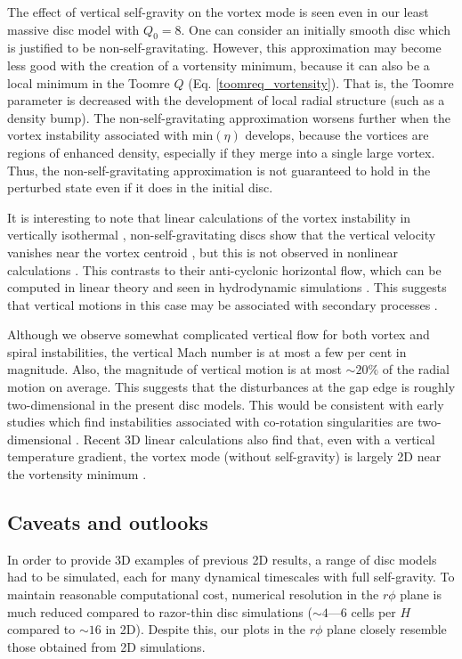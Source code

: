 The effect of vertical self-gravity on the vortex mode is seen even in
our least massive disc model with $Q_0=8$. One can consider an
initially smooth disc which is justified to be
non-self-gravitating. However, this approximation may become less good
with the creation of a vortensity minimum, because it
can also be a local minimum in the Toomre $Q$
(Eq. \ref{toomreq_vortensity}).  That is, the Toomre parameter is
decreased with the development of local radial structure (such as a density bump). 
The non-self-gravitating approximation worsens further when the vortex
instability associated with $\mathrm{min}(\eta)$ develops, because the   
vortices are regions of enhanced density, especially if they merge
into a single large vortex. Thus, the
non-self-gravitating approximation is not guaranteed to hold 
in the perturbed state even if it does in the initial disc.  


It is interesting to note that linear calculations of the vortex
instability in vertically isothermal , non-self-gravitating discs 
show that the vertical velocity vanishes near the vortex
centroid  \citep{meheut12a,lin12}, but this is not observed in
nonlinear calculations \citep[][ and in the present
  simulations]{meheut12a}.  This contrasts to their anti-cyclonic
horizontal flow, which can be computed in linear theory and seen in
hydrodynamic simulations \citep{li00,li01}.  This suggests that vertical 
motions in this case may be associated with secondary processes
\citep[e.g][]{goodman87}. 

Although we observe somewhat complicated vertical flow for both
vortex and spiral instabilities, the vertical Mach number is
at most a few per cent in magnitude. Also, the magnitude of
vertical motion is at most $\sim 20\%$  of the radial motion on
average. This suggests that the disturbances at the gap edge is 
roughly two-dimensional in the present disc models. This would be 
consistent with early studies which find instabilities associated with
co-rotation singularities are two-dimensional
\citep{papaloizou85,goldreich86}.  Recent 3D linear 
  calculations also find that, even with a vertical temperature gradient, 
  the vortex mode (without self-gravity) is
  largely 2D near the vortensity minimum \citep{lin12}.

\subsection{Caveats and outlooks}\label{caveats}

In order to provide 3D examples of previous 2D results, a range of 
disc models had to be simulated, each for many dynamical 
timescales with full self-gravity. To maintain reasonable
computational cost, numerical resolution in the $r\phi$ plane is much
reduced compared to razor-thin disc simulations ($\sim  4$---6 cells
per $H$ compared to $\sim 16$ in 2D).  Despite this, our
plots in the $r\phi$ plane closely resemble those obtained from 2D
simulations.  

